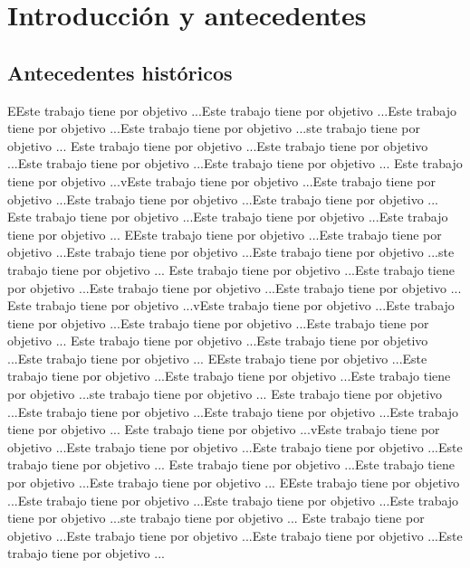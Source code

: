 \chapter{Introducción y antecedentes}
\section{Antecedentes históricos} 
EEste trabajo tiene por objetivo ...Este trabajo tiene por objetivo ...Este trabajo tiene por objetivo ...Este trabajo tiene por objetivo ...ste trabajo tiene por objetivo ...
Este trabajo tiene por objetivo ...Este trabajo tiene por objetivo ...Este trabajo tiene por objetivo ...Este trabajo tiene por objetivo ...
Este trabajo tiene por objetivo ...vEste trabajo tiene por objetivo ...Este trabajo tiene por objetivo ...Este trabajo tiene por objetivo ...Este trabajo tiene por objetivo ...
Este trabajo tiene por objetivo ...Este trabajo tiene por objetivo ...Este trabajo tiene por objetivo ...
EEste trabajo tiene por objetivo ...Este trabajo tiene por objetivo ...Este trabajo tiene por objetivo ...Este trabajo tiene por objetivo ...ste trabajo tiene por objetivo ...
Este trabajo tiene por objetivo ...Este trabajo tiene por objetivo ...Este trabajo tiene por objetivo ...Este trabajo tiene por objetivo ...
Este trabajo tiene por objetivo ...vEste trabajo tiene por objetivo ...Este trabajo tiene por objetivo ...Este trabajo tiene por objetivo ...Este trabajo tiene por objetivo ...
Este trabajo tiene por objetivo ...Este trabajo tiene por objetivo ...Este trabajo tiene por objetivo ...
EEste trabajo tiene por objetivo ...Este trabajo tiene por objetivo ...Este trabajo tiene por objetivo ...Este trabajo tiene por objetivo ...ste trabajo tiene por objetivo ...
Este trabajo tiene por objetivo ...Este trabajo tiene por objetivo ...Este trabajo tiene por objetivo ...Este trabajo tiene por objetivo ...
Este trabajo tiene por objetivo ...vEste trabajo tiene por objetivo ...Este trabajo tiene por objetivo ...Este trabajo tiene por objetivo ...Este trabajo tiene por objetivo ...
Este trabajo tiene por objetivo ...Este trabajo tiene por objetivo ...Este trabajo tiene por objetivo ...
EEste trabajo tiene por objetivo ...Este trabajo tiene por objetivo ...Este trabajo tiene por objetivo ...Este trabajo tiene por objetivo ...ste trabajo tiene por objetivo ...
Este trabajo tiene por objetivo ...Este trabajo tiene por objetivo ...Este trabajo tiene por objetivo ...Este trabajo tiene por objetivo ...
